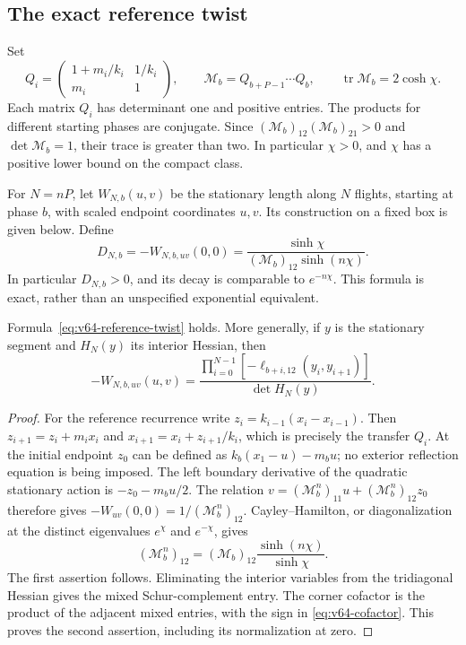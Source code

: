 \subsection{The exact reference twist}

Set
\begin{equation}\label{eq:v64-transfer}
 Q_i=\begin{pmatrix}1+m_i/k_i&1/k_i\\m_i&1\end{pmatrix},\qquad
 \mathcal M_b=Q_{b+P-1}\cdots Q_b,
 \qquad \operatorname{tr}\mathcal M_b=2\cosh\chi.
\end{equation}
Each matrix $Q_i$ has determinant one and positive entries.  The products
for different starting phases are conjugate.  Since
$(\mathcal M_b)_{12}(\mathcal M_b)_{21}>0$ and
$\det\mathcal M_b=1$, their trace is greater than two.  In particular
$\chi>0$, and $\chi$ has a positive lower bound on the compact class.

For $N=nP$, let $W_{N,b}(u,v)$ be the stationary length along $N$
flights, starting at phase $b$, with scaled endpoint coordinates $u,v$.
Its construction on a fixed box is given below.  Define
\begin{equation}\label{eq:v64-reference-twist}
 D_{N,b}=-W_{N,b,uv}(0,0)
       =\frac{\sinh\chi}{(\mathcal M_b)_{12}\sinh(n\chi)}.
\end{equation}
In particular $D_{N,b}>0$, and its decay is comparable to $e^{-n\chi}$.
This formula is exact, rather than an unspecified exponential equivalent.

\begin{lemma}
\label{lem:v64-reference}
Formula~\eqref{eq:v64-reference-twist} holds.  More generally, if $y$ is
the stationary segment and $H_N(y)$ its interior Hessian, then
\begin{equation}\label{eq:v64-cofactor}
 -W_{N,b,uv}(u,v)=
 \frac{\prod_{i=0}^{N-1}[-\ell_{b+i,12}(y_i,y_{i+1})]}{\det H_N(y)}.
\end{equation}
\end{lemma}
\begin{proof}
For the reference recurrence write
$z_i=k_{i-1}(x_i-x_{i-1})$.  Then
$z_{i+1}=z_i+m_ix_i$ and $x_{i+1}=x_i+z_{i+1}/k_i$,
which is precisely the transfer $Q_i$.  At the initial endpoint $z_0$
can be defined as $k_b(x_1-u)-m_bu$; no exterior reflection equation
is being imposed.  The left boundary derivative of the quadratic
stationary action is $-z_0-m_bu/2$.  The relation
$v=(\mathcal M_b^n)_{11}u+(\mathcal M_b^n)_{12}z_0$
therefore gives $-W_{uv}(0,0)=1/(\mathcal M_b^n)_{12}$.
Cayley--Hamilton, or diagonalization at the distinct eigenvalues
$e^{\chi}$ and $e^{-\chi}$, gives
\[
 (\mathcal M_b^n)_{12}
       =(\mathcal M_b)_{12}\frac{\sinh(n\chi)}{\sinh\chi}.
\]
The first assertion follows.  Eliminating the interior variables from
the tridiagonal Hessian gives the mixed Schur-complement entry.
The corner cofactor is the product of the adjacent mixed entries,
with the sign in \eqref{eq:v64-cofactor}.  This proves the second
assertion, including its normalization at zero.
\end{proof}

